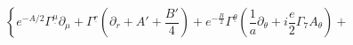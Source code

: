 \begin{equation}
\left\{
e^{-A/2}\Gamma^{\underline \mu}  \partial_\mu + \Gamma^{\underline r}
\left(\partial_r + A' +\frac{B'}{4}\right)
+e^{-\frac{B}{2}}\Gamma^{\underline\theta}
\left(\frac{1}{a}\partial_\theta
+i\frac{e}{2}\Gamma_7A_\theta\right)+\right.
\label{dirac}
\end{equation}

